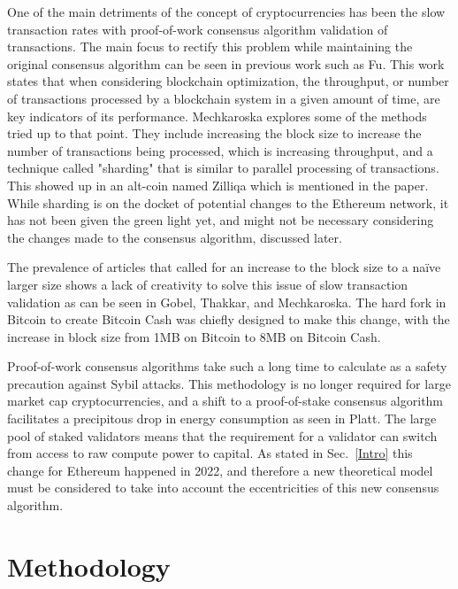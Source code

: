 \documentclass[conference]{IEEEtran}
\begin{document}
One of the main detriments of the concept of cryptocurrencies has been the slow transaction
rates with proof-of-work consensus algorithm validation of transactions. The main focus to rectify 
this problem while maintaining the original consensus algorithm can be seen in previous work such 
as Fu\cite{2020_IEEEToVT_Fu}. This work states that when considering blockchain optimization, 
the throughput, or number of transactions processed by a blockchain system in a given amount of 
time, are key indicators of its performance. Mechkaroska\cite{2018_TELFOR_Mechkaroska} explores
some of the methods tried up to that point. They include increasing the block size to increase the 
number of transactions being processed, which is increasing throughput, and a technique called 
"sharding" that is similar to parallel processing of transactions. This showed up in an alt-coin named 
Zilliqa\cite{2017_Zilliqa_Zilliqa} which is mentioned in the paper. While sharding is on the docket of 
potential changes to the Ethereum network, it has not been given the green light yet, and might not
be necessary considering the changes made to the consensus algorithm, discussed later.

The prevalence of articles that called for an increase to the block size to a na\"ive larger size shows 
a lack of creativity to solve this issue of slow transaction validation as can be seen in Gobel, Thakkar, 
and Mechkaroska\cite{2017_IEEE_Gobel, 2018_IEEE_Thakkar, 2018_TELFOR_Mechkaroska}. The 
hard fork in Bitcoin to create Bitcoin Cash was chiefly designed to make this change, with the increase 
in block size from 1MB on Bitcoin to 8MB on Bitcoin Cash. 

Proof-of-work consensus algorithms take such a long time to calculate as a safety precaution against
Sybil attacks. This methodology is no longer required for large market cap cryptocurrencies, and a 
shift to a proof-of-stake consensus algorithm facilitates a precipitous drop in energy consumption
as seen in Platt\cite{2021_IEEEQRSC_Platt}. The large pool of staked validators means that the 
requirement for a validator can switch from access to raw compute power to capital. As stated in 
Sec.~\ref{Intro} this change for Ethereum happened in 2022, and therefore a new theoretical model
must be considered to take into account the eccentricities of this new consensus algorithm. 

\section{Methodology}
\end{document}

